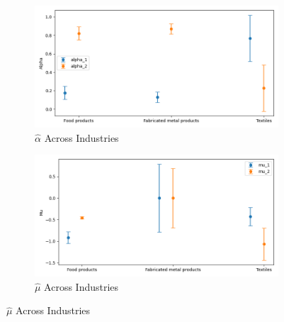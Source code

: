 \documentclass{article}
\begin{document}
\begin{figure}[ht!]
    \centering 
    \caption{I.I.D Normal Model Across Industries}
    \begin{subfigure}[t]{0.32\textwidth}
        \centering
        \includegraphics[width=\textwidth]{figure/stationary_normal_kmshare_ciiu_alpha_across_industries.png}
        \caption{$\hat\alpha$ Across Industries}
    \end{subfigure}
    \begin{subfigure}[t]{0.32\textwidth}
        \centering
        \includegraphics[width=\textwidth]{figure/stationary_normal_kmshare_ciiu_mu_across_industries.png}
        \caption{$\hat\mu$ Across Industries}
    \end{subfigure}
 

\end{figure}
\end{document}
